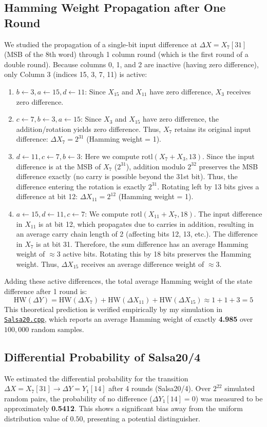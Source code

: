 \documentclass{article}
\begin{document}
\subsection{Hamming Weight Propagation after One Round}
We studied the propagation of a single-bit input difference at $\Delta X = X_7[31]$ (MSB of the 8th word) through 1 column round (which is the first round of a double round).
Because columns 0, 1, and 2 are inactive (having zero difference), only Column 3 (indices 15, 3, 7, 11) is active:
\begin{enumerate}
    \item $b \gets 3, a \gets 15, d \gets 11$: Since $X_{15}$ and $X_{11}$ have zero difference, $X_3$ receives zero difference.
    \item $c \gets 7, b \gets 3, a \gets 15$: Since $X_3$ and $X_{15}$ have zero difference, the addition/rotation yields zero difference. Thus, $X_7$ retains its original input difference: $\Delta X_7 = 2^{31}$ (Hamming weight = 1).
    \item $d \gets 11, c \gets 7, b \gets 3$: Here we compute $\text{rotl}(X_7 + X_3, 13)$. Since the input difference is at the MSB of $X_7$ ($2^{31}$), addition modulo $2^{32}$ preserves the MSB difference exactly (no carry is possible beyond the 31st bit). Thus, the difference entering the rotation is exactly $2^{31}$. Rotating left by 13 bits gives a difference at bit 12: $\Delta X_{11} = 2^{12}$ (Hamming weight = 1).
    \item $a \gets 15, d \gets 11, c \gets 7$: We compute $\text{rotl}(X_{11} + X_7, 18)$. The input difference in $X_{11}$ is at bit 12, which propagates due to carries in addition, resulting in an average carry chain length of 2 (affecting bits 12, 13, etc.). The difference in $X_7$ is at bit 31. Therefore, the sum difference has an average Hamming weight of $\approx 3$ active bits. Rotating this by 18 bits preserves the Hamming weight. Thus, $\Delta X_{15}$ receives an average difference weight of $\approx 3$.
\end{enumerate}
Adding these active differences, the total average Hamming weight of the state difference after 1 round is:
\[ \text{HW}(\Delta Y) = \text{HW}(\Delta X_7) + \text{HW}(\Delta X_{11}) + \text{HW}(\Delta X_{15}) \approx 1 + 1 + 3 = 5 \]
This theoretical prediction is verified empirically by my simulation in \href{file:///home/scorzion/Tech/Crypto/SKC_IITH/Day6/solutions/Salsa20.cpp}{\texttt{Salsa20.cpp}}, which reports an average Hamming weight of exactly \textbf{4.985} over $100,000$ random samples.

\subsection{Differential Probability of Salsa20/4}
We estimated the differential probability for the transition $\Delta X = X_7[31] \to \Delta Y = Y_1[14]$ after 4 rounds (Salsa20/4). Over $2^{22}$ simulated random pairs, the probability of no difference ($\Delta Y_1[14] = 0$) was measured to be approximately \textbf{0.5412}. This shows a significant bias away from the uniform distribution value of $0.50$, presenting a potential distinguisher.
\end{document}
